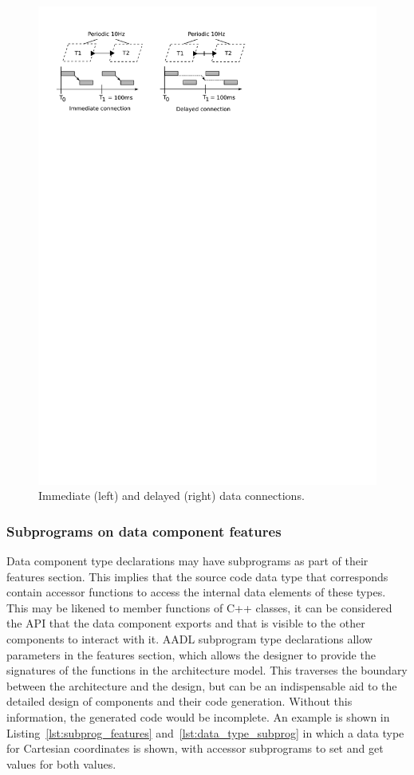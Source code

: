 \begin{figure}
\centering
\includegraphics[scale=0.75]{figs/conn_semantics}
\caption{Immediate (left) and delayed (right) data connections.}
\label{fig:conn_semantics}
\end{figure}

\subsubsection{Subprograms on data component features}
Data component type declarations may have subprograms as part of their
features section. This implies that the source code data type that
corresponds contain accessor functions to access the internal data
elements of these types. This may be likened to member functions of
C++ classes, it can be considered the API that the data component
exports and that is visible to the other components to interact with
it. AADL subprogram type declarations allow parameters in the features
section, which allows the designer to provide the signatures of the
functions in the architecture model. This traverses the boundary
between the architecture and the design, but can be an indispensable
aid to the detailed design of components and their code
generation. Without this information, the generated code would be
incomplete. An example is shown in Listing~\ref{lst:subprog_features}
and~\ref{lst:data_type_subprog} in which a data type for Cartesian
coordinates is shown, with accessor subprograms to set and get values
for both values.

